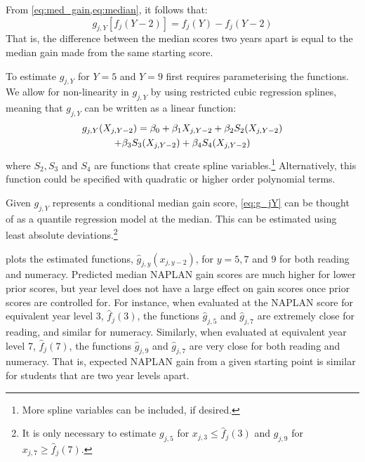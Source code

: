 From \cref{eq:med_gain,eq:median}, it follows that:
\begin{equation} 
g_{j,Y}\left[f_{j}(Y-2)\right] = f_{j}(Y) - f_{j}(Y-2) \label{eq:gf}
\end{equation}
That is, the difference between the median scores two years apart is equal to the median gain made from the same starting score.

To estimate $g_{j,Y}$ for $Y=5$ and $Y=9$ first requires parameterising the functions. We allow for non-linearity in $g_{j,Y}$ by using restricted cubic regression splines, meaning that $g_{j,Y}$ can be written as a linear function:
\begin{equation} \begin{array}{c}
g_{j,Y}(X_{j,Y-2}) = \beta_{0} + \beta_{1}X_{j,Y-2} + \beta_{2}S_{2}(X_{j,Y-2}) \vspace{0.3em}\\
+ \beta_{3}S_{3}(X_{j,Y-2}) + \beta_{4}S_{4}(X_{j,Y-2}) \label{eq:g_jY}
\end{array} \end{equation}
where $S_{2},S_{3}$ and $S_{4}$ are functions that create spline variables.\footnote{More spline variables can be included, if desired.} Alternatively, this function could be specified with quadratic or higher order polynomial terms.

Given $g_{j,Y}$ represents a conditional median gain score, \cref{eq:g_jY} can be thought of as a quantile regression model at the median. This can be estimated using least absolute deviations.\footnote{It is only necessary to estimate $g_{j,5}$ for $x_{j,3}\leq \widehat{f}_{j}(3)$ and $g_{j,9}$ for $x_{j,7} \geq \widehat{f}_{j}(7)$.}

 plots the estimated functions, $\widehat{g}_{j,y}\left(x_{j,y-2}\right)$, for $y=5,7$ and $9$ for both reading and numeracy. Predicted median NAPLAN gain scores are much higher for lower prior scores, but year level does not have a large effect on gain scores once prior scores are controlled for. For instance, when evaluated at the NAPLAN score for equivalent year level 3, $\widehat{f}_{j}\left(3\right)$, the functions $\widehat{g}_{j,5}$ and $\widehat{g}_{j,7}$ are extremely close for reading, and similar for numeracy. Similarly, when evaluated at equivalent year level 7, $\widehat{f}_{j}\left(7\right)$, the functions $\widehat{g}_{j,9}$ and $\widehat{g}_{j,7}$ are very close for both reading and numeracy. That is, expected NAPLAN gain from a given starting point is similar for students that are two year levels apart.

